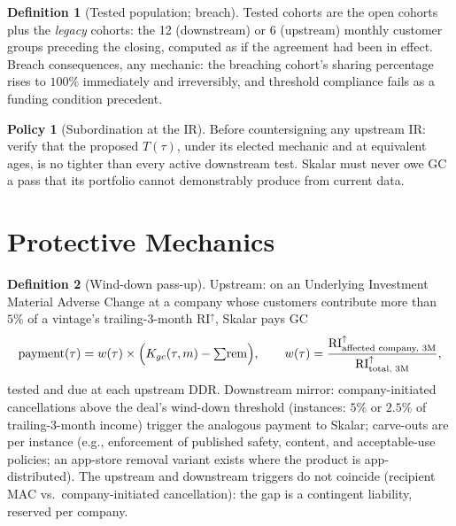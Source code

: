 \documentclass[11pt, a4paper]{article}
\theoremstyle{definition}
\newtheorem{definition}{Definition}[section]
\newtheorem{policy}{Policy}
\newcommand{\src}[1]{}
\newcommand{\GCCIA}{upstream facility}
\newcommand{\KCIA}{downstream agreement}
\newcommand{\FudoTS}{downstream term sheet}
\newcommand{\RIup}{\mathrm{RI}^{\uparrow}}        %
\newcommand{\rem}{\mathrm{rem}}                   %
\newcommand{\Kgc}{K_{gc}}                         %
\begin{document}
\begin{definition}[Tested population; breach]\label{def:breach}
Tested cohorts are the open cohorts plus the \emph{legacy} cohorts: the 12 (downstream) or 6 (upstream) monthly customer groups preceding the closing, computed as if the agreement had been in effect. Breach consequences, any mechanic: the breaching cohort's sharing percentage rises to $100\%$ immediately and irreversibly, and threshold compliance fails as a funding condition precedent.
\src{\KCIA{} Sch.~A (``Legacy Reference Cohort'', ``Investor Sharing Percentage''), \S3.2(d)(vi); \GCCIA{} Sch.~A (``Legacy Reference Cohort''), \S3.2.}
\end{definition}

\begin{policy}[Subordination at the IR]\label{pol:subordination}
Before countersigning any upstream IR: verify that the proposed $T(\tau)$, under its elected mechanic and at equivalent ages, is no tighter than every active downstream test. Skalar must never owe GC a pass that its portfolio cannot demonstrably produce from current data.
\end{policy}

\section{Protective Mechanics}\label{sec:protect}

\begin{definition}[Wind-down pass-up]\label{def:winddown}
Upstream: on an Underlying Investment Material Adverse Change at a company whose customers contribute more than $5\%$ of a vintage's trailing-3-month $\RIup$, Skalar pays GC
\[
\mathrm{payment}(\tau) = w(\tau) \times \Bigl( \Kgc(\tau, m) - {\textstyle\sum} \rem \Bigr),
\qquad
w(\tau) = \frac{\RIup_{\text{affected company, 3M}}}{\RIup_{\text{total, 3M}}},
\]
tested and due at each upstream DDR. Downstream mirror: company-initiated cancellations above the deal's wind-down threshold (instances: $5\%$ or $2.5\%$ of trailing-3-month income) trigger the analogous payment to Skalar; carve-outs are per instance (e.g., enforcement of published safety, content, and acceptable-use policies; an app-store removal variant exists where the product is app-distributed). The upstream and downstream triggers do not coincide (recipient MAC vs.\ company-initiated cancellation): the gap is a contingent liability, reserved per company.
\src{\GCCIA{} \S2.2(f), Sch.~A (``Underlying Investment Wind-Down Payment''); template: \KCIA{} Sch.~A \S2.3; \FudoTS{} ``Product Line Wind-Downs''.}
\end{definition}
\end{document}
